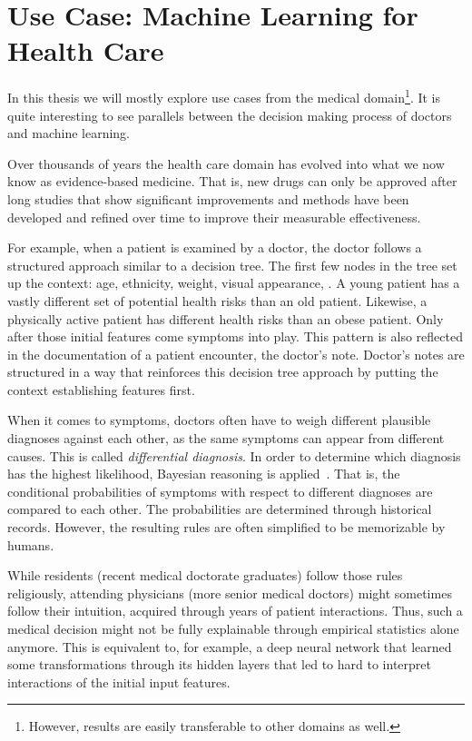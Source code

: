 \section{Use Case: Machine Learning for Health Care}
\label{sec:usecase}
In this thesis we will mostly explore use cases from the medical domain\footnote{However, results are easily transferable to other domains as well.}.
It is quite interesting to see parallels between the decision making process of doctors and machine learning.

Over thousands of years the health care domain has evolved into what we now know as evidence-based medicine.
That is, new drugs can only be approved after long studies that show significant improvements and methods have been developed and refined over time to improve their measurable effectiveness.

For example, when a patient is examined by a doctor, the doctor follows a structured approach similar to a decision tree.
The first few nodes in the tree set up the context: age, ethnicity, weight, visual appearance, \etc.
A young patient has a vastly different set of potential health risks than an old patient.
Likewise, a physically active patient has different health risks than an obese patient.
Only after those initial features come symptoms into play.
This pattern is also reflected in the documentation of a patient encounter, the doctor's note.
Doctor's notes are structured in a way that reinforces this decision tree approach by putting the context establishing features first.

When it comes to symptoms, doctors often have to weigh different plausible diagnoses against each other, as the same symptoms can appear from different causes.
This is called \emph{differential diagnosis}.
In order to determine which diagnosis has the highest likelihood, Bayesian reasoning is applied~\cite{mdbook}.
That is, the conditional probabilities of symptoms with respect to different diagnoses are compared to each other.
The probabilities are determined through historical records.
However, the resulting rules are often simplified to be memorizable by humans.

While residents (recent medical doctorate graduates) follow those rules religiously, attending physicians (more senior medical doctors) might sometimes follow their intuition, acquired through years of patient interactions.
Thus, such a medical decision might not be fully explainable through empirical statistics alone anymore.
This is equivalent to, for example, a deep neural network that learned some transformations through its hidden layers that led to hard to interpret interactions of the initial input features.

